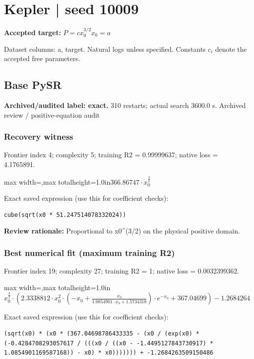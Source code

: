 \documentclass[10pt,letterpaper,landscape]{article}
\begin{document}
\section*{Kepler | seed 10009}
\textbf{Accepted target:} $\displaystyle P=c x_0^{3/2}$\hfill $x_0=a$\par
{\small Dataset columns: a, target. Natural logs unless specified. Constants $c_i$ denote the accepted free parameters.}\par\medskip
\begin{minipage}[t]{0.485\textwidth}
\subsection*{Base PySR}
\textbf{Archived/audited label: exact.} 310 restarts; actual search 3600.0 s.
{\small Archived review / positive-equation audit}
\subsubsection*{Recovery witness}
Frontier index 4; complexity 5; training R2 = 0.99999637; native loss = 4.1765891.
\begin{center}\begin{adjustbox}{max width=\linewidth,max totalheight=1.0in}$\displaystyle 366.86747 \cdot x_{0}^{\frac{3}{2}}$\end{adjustbox}\end{center}
{\scriptsize Exact saved expression (use this for coefficient checks):}
\begin{lstlisting}
cube(sqrt(x0 * 51.247514078332024))
\end{lstlisting}
{\small\textbf{Review rationale:} Proportional to x0\textasciicircum{}(3/2) on the physical positive domain.}
\subsubsection*{Best numerical fit (maximum training R2)}
Frontier index 19; complexity 27; training R2 = 1; native loss = 0.0032399362.
\begin{center}\begin{adjustbox}{max width=\linewidth,max totalheight=1.0in}$\displaystyle x_{0}^{\frac{3}{2}} \cdot \left(2.3338812 \cdot x_{0}^{2} \cdot \left(- x_{0} + \frac{x_{0}}{1.0854901 \cdot x_{0} + 1.5734318}\right) \cdot e^{- x_{0}} + 367.04699\right) - 1.2684264$\end{adjustbox}\end{center}
{\scriptsize Exact saved expression (use this for coefficient checks):}
\begin{lstlisting}
(sqrt(x0) * (x0 * (367.04698786433335 - (x0 / (exp(x0) * (-0.4284708293057617 / (((x0 / ((x0 - -1.4495127843730917) * 1.0854901169587168)) - x0) * x0))))))) + -1.2684263509150486
\end{lstlisting}
\end{minipage}\hfill
\end{document}
